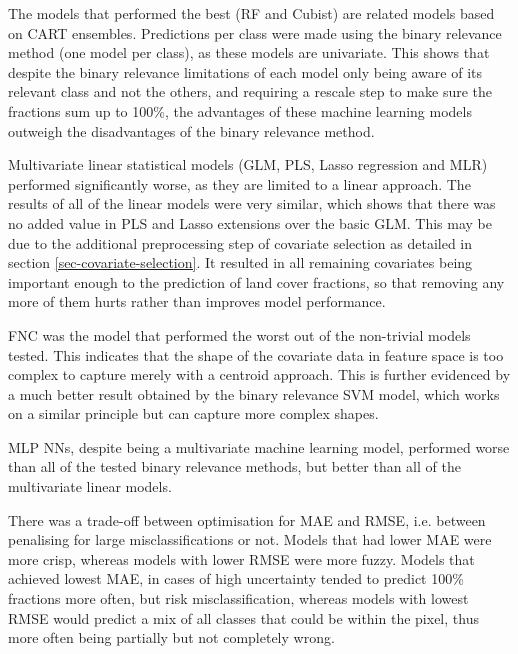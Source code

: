 \documentclass[a4paper,10pt]{article}
\begin{document}
The models that performed the best (\gls{RF} and Cubist) are related models based on \gls{CART} ensembles.
Predictions per class were made using the binary relevance method (one model per class), as these models are univariate.
This shows that despite the binary relevance limitations of each model only being aware of its relevant class and not the others, and requiring a rescale step to make sure the fractions sum up to 100\%, the advantages of these machine learning models outweigh the disadvantages of the binary relevance method.

Multivariate linear statistical models (\gls{GLM}, \gls{PLS}, Lasso regression and \gls{MLR}) performed significantly worse, as they are limited to a linear approach.
The results of all of the linear models were very similar, which shows that there was no added value in \gls{PLS} and Lasso extensions over the basic \gls{GLM}.
This may be due to the additional preprocessing step of covariate selection as detailed in section \ref{sec-covariate-selection}.
It resulted in all remaining covariates being important enough to the prediction of land cover fractions, so that removing any more of them hurts rather than improves model performance.

\Gls{FNC} was the model that performed the worst out of the non-trivial models tested.
This indicates that the shape of the covariate data in feature space is too complex to capture merely with a centroid approach.
This is further evidenced by a much better result obtained by the binary relevance \gls{SVM} model, which works on a similar principle but can capture more complex shapes.

\Gls{MLP} \glspl{NN}, despite being a multivariate machine learning model, performed worse than all of the tested binary relevance methods, but better than all of the multivariate linear models.

There was a trade-off between optimisation for \gls{MAE} and \gls{RMSE}, i.e. between penalising for large misclassifications or not.
Models that had lower \gls{MAE} were more crisp, whereas models with lower \gls{RMSE} were more fuzzy.
Models that achieved lowest \gls{MAE}, in cases of high uncertainty tended to predict 100\% fractions more often, but risk misclassification, whereas models with lowest \gls{RMSE} would predict a mix of all classes that could be within the pixel, thus more often being partially but not completely wrong.
\end{document}

